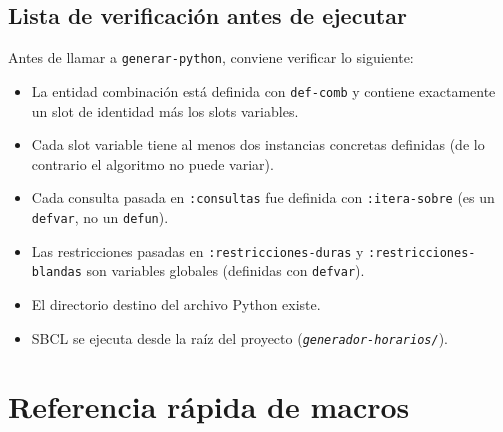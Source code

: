 \documentclass[12pt,a4paper]{article}
\newcommand{\code}[1]{\texttt{#1}}
\newcommand{\file}[1]{\texttt{\textit{#1}}}
\begin{document}
\subsection{Lista de verificación antes de ejecutar}

Antes de llamar a \code{generar-python}, conviene verificar lo siguiente:

\begin{itemize}[label=$\square$]
  \item La entidad combinación está definida con \code{def-comb} y
    contiene exactamente un slot de identidad más los slots variables.
  \item Cada slot variable tiene al menos dos instancias concretas
    definidas (de lo contrario el algoritmo no puede variar).
  \item Cada consulta pasada en \code{:consultas} fue definida con
    \code{:itera-sobre} (es un \code{defvar}, no un \code{defun}).
  \item Las restricciones pasadas en \code{:restricciones-duras} y
    \code{:restricciones-blandas} son variables globales (definidas
    con \code{defvar}).
  \item El directorio destino del archivo Python existe.
  \item SBCL se ejecuta desde la raíz del proyecto
    (\file{generador-horarios/}).
\end{itemize}

\section{Referencia rápida de macros}
\label{sec:referencia}
\end{document}

